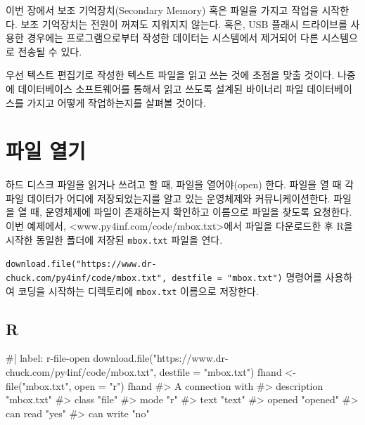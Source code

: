 \documentclass[
  letterpaper,
]{book}
\newenvironment{Shaded}{\begin{snugshade}}{\end{snugshade}}
\newcommand{\NormalTok}[1]{\textcolor[rgb]{0.00,0.23,0.31}{#1}}
\begin{document}
이번 장에서 보조 기억장치(Secondary Memory) 혹은 파일을 가지고 작업을
시작한다. 보조 기억장치는 전원이 꺼져도 지워지지 않는다. 혹은, USB
플래시 드라이브를 사용한 경우에는 프로그램으로부터 작성한 데이터는
시스템에서 제거되어 다른 시스템으로 전송될 수 있다.

우선 텍스트 편집기로 작성한 텍스트 파일을 읽고 쓰는 것에 초점을 맞출
것이다. 나중에 데이터베이스 소프트웨어를 통해서 읽고 쓰도록 설계된
바이너리 파일 데이터베이스를 가지고 어떻게 작업하는지를 살펴볼 것이다.

\section{파일 열기}\label{r-file-open}

  

하드 디스크 파일을 읽거나 쓰려고 할 때, 파일을 열어야(open) 한다. 파일을
열 때 각 파일 데이터가 어디에 저장되었는지를 알고 있는 운영체제와
커뮤니케이션한다. 파일을 열 때, 운영체제에 파일이 존재하는지 확인하고
이름으로 파일을 찾도록 요청한다.\\
이번 예제에서, \textless www.py4inf.com/code/mbox.txt\textgreater 에서
파일을 다운로드한 후 R을 시작한 동일한 폴더에 저장된 \texttt{mbox.txt}
파일을 연다.

\texttt{download.file("https://www.dr-chuck.com/py4inf/code/mbox.txt",\ destfile\ =\ "mbox.txt")}
명령어를 사용하여 코딩을 시작하는 디렉토리에 \texttt{mbox.txt} 이름으로
저장한다.

\subsection{R}

\begin{Shaded}
\begin{Highlighting}[]
\NormalTok{\#| label: r{-}file{-}open}
\NormalTok{download.file("https://www.dr{-}chuck.com/py4inf/code/mbox.txt", }
\NormalTok{              destfile = "mbox.txt")}
\NormalTok{fhand \textless{}{-} file("mbox.txt", open = "r")}
\NormalTok{fhand}
\NormalTok{\#\textgreater{} A connection with                           }
\NormalTok{\#\textgreater{} description "mbox.txt"}
\NormalTok{\#\textgreater{} class       "file"         }
\NormalTok{\#\textgreater{} mode        "r"            }
\NormalTok{\#\textgreater{} text        "text"         }
\NormalTok{\#\textgreater{} opened      "opened"       }
\NormalTok{\#\textgreater{} can read    "yes"          }
\NormalTok{\#\textgreater{} can write   "no"  }
\end{Highlighting}
\end{Shaded}
\end{document}
